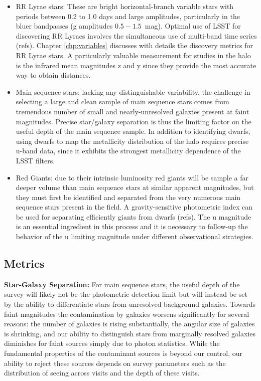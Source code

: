 \begin{itemize}

\item RR Lyrae stars: These are bright horizontal-branch variable stars with
periods between 0.2 to 1.0 days and large amplitudes, particularly in the bluer 
bandpasses (g amplitudes $0.5 - 1.5$~mag). Optimal use of LSST for discovering
RR Lyraes involves the simultaneous use of multi-band time series (refs).
Chapter \ref{chp:variables} discusses with details the discovery metrics for RR Lyrae stars.
A particularly valuable measurement for studies in the halo is the infrared mean
magnitudes z and y since they provide the most accurate way to obtain 
distances.

\item Main sequence stars: lacking any distinguishable variability, the
challenge in selecting a large and clean sample of main sequence stars comes
from tremendous number of small and nearly-unresolved galaxies present at
faint magnitudes. Precise star/galaxy separation is thus the limiting factor
on the useful depth of the main sequence sample. In addition to identifying
dwarfs, using dwarfs to map the metallicity distribution of the halo requires
precise u-band data, since it exhibits the strongest metallicity dependence of
the LSST filters.

\item Red Giants: due to their intrinsic luminosity red giants will be sample
a far deeper volume than main sequence stars at similar apparent magnitudes,
but they must first be identified and separated from the very numerous main
sequence stars present in the field. A gravity-sensitive photometric index can
be used for separating efficiently giants from dwarfs (refs). The u magnitude
is an essential ingredient in this process and it is necessary to follow-up
the behavior of the u limiting magnitude under different observational
strategies.

\end{itemize}


\subsection{Metrics}
\label{sec:keyword:MW_Halo_metrics}

\textbf{Star-Galaxy Separation:} For main sequence stars, the useful depth of
the survey will likely not be the photometric detection limit but will instead
be set by the ability to differentiate stars from unresolved background
galaxies. Towards faint magnitudes the contamination by galaxies worsens
significantly for several reasons: the number of galaxies is rising
substantially, the angular size of galaxies is shrinking, and our ability to
distinguish stars from marginally resolved galaxies diminishes for faint
sources simply due to photon statistics. While the fundamental properties of
the contaminant sources is beyond our control, our ability to reject these
sources depends on survey parameters such as the distribution of seeing across
visits and the depth of these visits.

